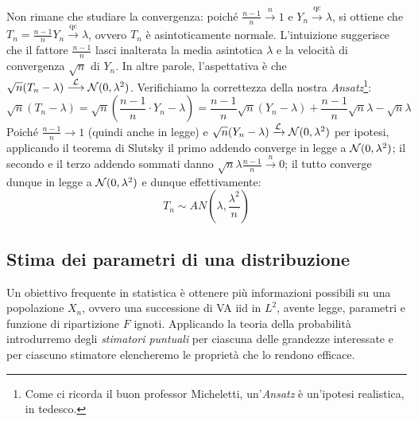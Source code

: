 \begin{ese}
  Non rimane che studiare la convergenza: poiché $\frac{n-1}n \stackrel{n}{\longrightarrow} 1$ e $Y_n \stackrel{\text{qc}}{\longrightarrow} \lambda$, si ottiene che $T_n = \frac{n-1} n Y_n \stackrel{\text{qc}}{\longrightarrow} \lambda$, ovvero $T_n$ è asintoticamente normale. L'intuizione suggerisce che il fattore $\frac{n-1}n$ lasci inalterata la media asintotica $\lambda$ e la velocità di convergenza $\sqrt n$ di $Y_n$. In altre parole, l'aspettativa è che $\sqrt n (T_n - \lambda) \stackrel{\mathcal L}{\longrightarrow} \mathcal N(0,\lambda^2)$. Verifichiamo la correttezza della nostra \textit{Ansatz}\footnote{Come ci ricorda il buon professor Micheletti, un'\textit{Ansatz} è un'ipotesi realistica, in tedesco.}:
  $$\sqrt n (T_n - \lambda) = \sqrt n \left(\frac{n-1} n \cdot Y_n - \lambda\right) = \frac{n-1} n \sqrt n (Y_n - \lambda) + \frac{n-1} n  \sqrt n \lambda - \sqrt n \lambda$$
  Poiché $\frac{n-1}n \to 1$ (quindi anche in legge) e $\sqrt n (Y_n - \lambda) \xrightarrow{\mathcal L} \mathcal N(0, \lambda^2)$ per ipotesi, applicando il teorema di Slutsky il primo addendo converge in legge a $\mathcal N(0,\lambda^2)$; il secondo e il terzo addendo sommati danno $\sqrt n \lambda \frac{n-1} n \xrightarrow{n} 0$; il tutto converge dunque in legge a $\mathcal N(0,\lambda^2)$ e dunque effettivamente:
  $$ T_n \sim AN \left( \lambda, \frac{\lambda^2} n \right)$$
\end{ese}


\subsection{Stima dei parametri di una distribuzione} \label{applicazioni-statistica}
Un obiettivo frequente in statistica è ottenere più informazioni possibili su una popolazione $X_n$, ovvero una successione di VA iid in $L^2$, avente legge, parametri e funzione di ripartizione $F$ ignoti.
Applicando la teoria della probabilità introdurremo degli \emph{stimatori puntuali} per ciascuna delle grandezze interessate e per ciascuno stimatore elencheremo le proprietà che lo rendono efficace.
